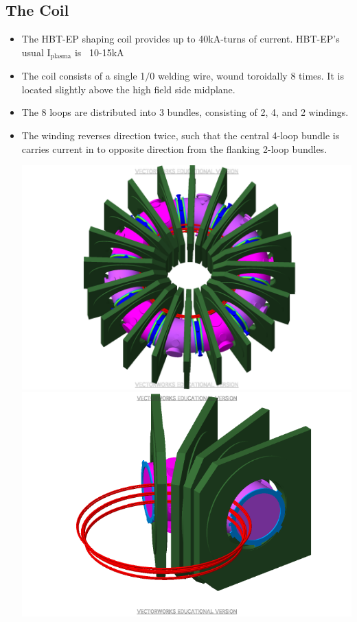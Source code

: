 \documentclass{article}
\begin{document}
\begin{multicols}{5}
\subsection{The Coil}
\begin{itemize}
\item The HBT-EP shaping coil provides up to 40kA-turns of current.  HBT-EP's usual I$_{\mbox{plasma}}$ is ~10-15kA
\item The coil consists of a single 1$/$0 welding wire, wound toroidally 8 times. It is located slightly above the high field side midplane.
\item The 8 loops are distributed into 3 bundles, consisting of 2, 4, and 2 windings.
\item The winding reverses direction twice, such that the central 4-loop bundle is carries current in to opposite direction from the flanking 2-loop bundles.\\
\begin{center}
\vspace{.25in}
\includegraphics[width=0.9\columnwidth]{HBT-EP_Full2.pdf}\\
\includegraphics[width=0.9\columnwidth]{HBT-EP_Section.pdf}

\end{center}
\end{itemize}
\end{multicols}
\end{document}
